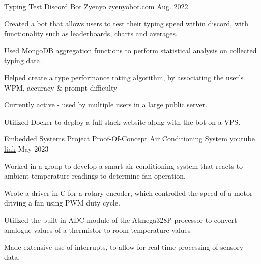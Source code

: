 \begin{cventries}
  \cventry
    {Typing Test Discord Bot} %
    {Zyenyo} %
    {\href{https://zyenyobot.com/}{zyenyobot.com}} %
    {Aug. 2022} %
    {
      \begin{cvitems} %
        \item {Created a bot that allows users to test their typing speed within discord, with functionality such as leaderboards, charts and averages.}
        \item {Used MongoDB aggregation functions to perform statistical analysis on collected typing data.}
        \item {Helped create a type performance rating algorithm, by associating the user's WPM, accuracy \& prompt difficulty}
        \item {Currently active - used by multiple users in a large public server.}
        \item {Utilized Docker to deploy a full stack website along with the bot on a VPS.}
      \end{cvitems}
    }


  \cventry
    {Embedded Systems Project} %
    {Proof-Of-Concept Air Conditioning System} %
    {\href{https://www.youtube.com/watch?v=NCE8KA36O8I}{youtube link}} %
    {May 2023} %
    {
      \begin{cvitems} %
        \item {Worked in a group to develop a smart air conditioning system that reacts to ambient temperature readings to determine fan operation.}
        \item {Wrote a driver in C for a rotary encoder, which controlled the speed of a motor driving a fan using PWM duty cycle.}
        \item {Utilized the built-in ADC module of the Atmega328P processor to convert analogue values of a thermistor to room temperature values}
        \item {Made extensive use of interrupts, to allow for real-time processing of sensory data.}
      \end{cvitems}
    }



\end{cventries}
